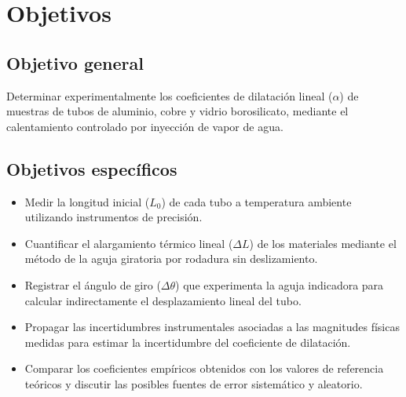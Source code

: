 
\section{Objetivos}

\subsection{Objetivo general}

Determinar experimentalmente los coeficientes de dilatación lineal ($\alpha$) de muestras de tubos de aluminio, cobre y vidrio borosilicato, mediante el calentamiento controlado por inyección de vapor de agua.

\subsection{Objetivos específicos}

\begin{itemize}
    \item Medir la longitud inicial ($L_0$) de cada tubo a temperatura ambiente utilizando instrumentos de precisión.
    \item Cuantificar el alargamiento térmico lineal ($\Delta L$) de los materiales mediante el método de la aguja giratoria por rodadura sin deslizamiento.
    \item Registrar el ángulo de giro ($\Delta\theta$) que experimenta la aguja indicadora para calcular indirectamente el desplazamiento lineal del tubo.
    \item Propagar las incertidumbres instrumentales asociadas a las magnitudes físicas medidas para estimar la incertidumbre del coeficiente de dilatación.
    \item Comparar los coeficientes empíricos obtenidos con los valores de referencia teóricos y discutir las posibles fuentes de error sistemático y aleatorio.
\end{itemize}